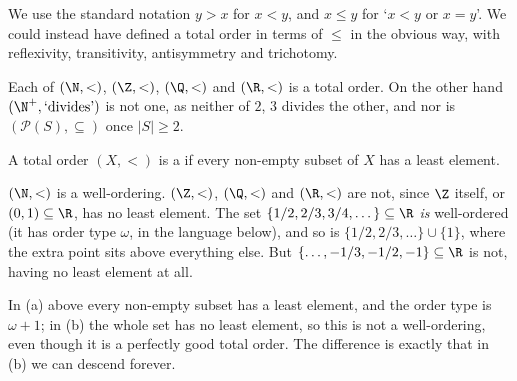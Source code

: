 We use the standard notation $y > x$ for $x < y$, and $x \leq y$ for `$x < y$ or $x = y$'. We could instead have defined a total order in terms of $\leq$ in the obvious way, with reflexivity, transitivity, antisymmetry and trichotomy.

\begin{example}
  Each of $(\N, <)$, $(\Z, <)$, $(\Q, <)$ and $(\R, <)$ is a total order. On the other hand $(\N^+, \text{`divides'})$ is not one, as neither of $2$, $3$ divides the other, and nor is $(\mathcal{P}(S), \subseteq)$ once $|S| \geq 2$.
\end{example}

\begin{definition}
  A total order $(X, <)$ is a  if every non-empty subset of $X$ has a least element.
\end{definition}

\begin{example}
  $(\N, <)$ is a well-ordering. $(\Z, <)$, $(\Q, <)$ and $(\R, <)$ are not, since $\Z$ itself, or $(0,1) \subseteq \R$, has no least element. The set $\{1/2, 2/3, 3/4, \dots\} \subseteq \R$ \emph{is} well-ordered (it has order type $\omega$, in the language below), and so is $\{1/2, 2/3, \dots\} \cup \{1\}$, where the extra point sits above everything else. But $\{\dots, -1/3, -1/2, -1\} \subseteq \R$ is not, having no least element at all.
\end{example}

\begin{center}
\end{center}

In (a) above every non-empty subset has a least element, and the order type is $\omega + 1$; in (b) the whole set has no least element, so this is not a well-ordering, even though it is a perfectly good total order. The difference is exactly that in (b) we can descend forever.

